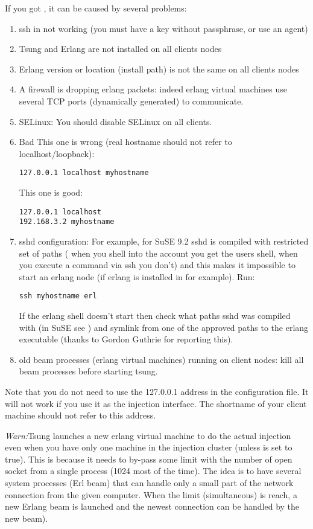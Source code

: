 \documentclass{TSUNG-en}
\begin{document}
\begin{appendix}
If you got , it can be caused by
several problems:
\begin{enumerate}
\item ssh in not working (you must have a key without passphrase, or
  use an agent)
\item Tsung and Erlang are not installed on all clients nodes
\item Erlang version or location (install path) is not the same on all clients nodes
\item A firewall is dropping erlang packets: indeed erlang virtual machines use
several TCP ports (dynamically generated) to communicate.
\item SELinux: You should disable SELinux on all clients.
\item Bad 
This one is wrong (real hostname should not refer to localhost/loopback):
\begin{Verbatim}
127.0.0.1 localhost myhostname
\end{Verbatim}
This one is good:
\begin{Verbatim}
127.0.0.1 localhost
192.168.3.2 myhostname
\end{Verbatim}
\item sshd configuration:
For example, for SuSE 9.2 sshd is compiled with restricted set of
paths (\ie{} when you shell into the account you get the users shell,
when you execute a command via ssh you don't) and this makes it
impossible to start an erlang node (if erlang is installed in
 for example).
Run:

\begin{Verbatim}
ssh myhostname erl
\end{Verbatim}

If the erlang shell doesn't start then check what paths sshd was compiled with
(in SuSE see ) and symlink from one of the approved paths
to the erlang executable (thanks to Gordon Guthrie for reporting this).
\item old beam processes (erlang virtual machines) running on client nodes: kill all
  beam processes before starting tsung.
\end{enumerate}


Note that you do not need to use the 127.0.0.1 address in the configuration file.
It will not work if you use it as the injection interface. The shortname
of your client machine should not refer to this address.

\emph{Warn:}Tsung launches a new erlang virtual machine to do the actual injection
even when you have only one machine in the injection cluster (unless
 is set to true). This is because it
needs to by-pass some limit with the number of open socket from a
single process (1024 most of the time). The idea is to have several
system processes (Erl beam) that can handle only a small part of the
network connection from the given computer. When the
 limit (simultaneous) is reach, a new Erlang beam
is launched and the newest connection can be handled by the new beam).


\end{appendix}
\end{document}
